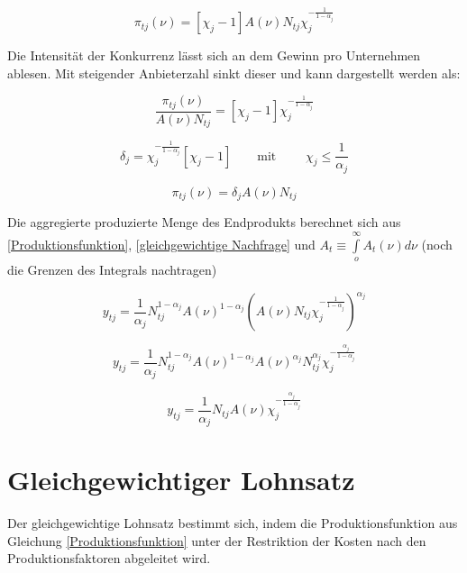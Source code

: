 \begin{equation}
\pi_{tj}(\nu)=[\chi_j-1]A(\nu)N_{tj}\chi_j^{-\frac{1}{1-\alpha_j}}
\end{equation}


Die Intensität der Konkurrenz lässt sich an dem Gewinn pro Unternehmen ablesen. Mit steigender Anbieterzahl sinkt dieser und kann dargestellt werden als:


\begin{equation}
\frac{\pi_{tj}(\nu)}{A(\nu)N_{tj}}=[\chi_j-1]\chi_j^{-\frac{1}{1-\alpha_j}}
\end{equation}


\begin{equation*}
\delta_j= \chi_j^{-\frac{1}{1-\alpha_j}}[\chi_j-1] \qquad  \text{mit } \qquad \chi_j\leq\frac{1}{\alpha_j}
\end{equation*}


\begin{equation}
\pi_{tj}(\nu)=\delta_jA(\nu)N_{tj}
\end{equation}


Die aggregierte produzierte Menge des Endprodukts berechnet sich aus \eqref{Produktionsfunktion}, \eqref{gleichgewichtige Nachfrage} und $A_t\equiv \int \limits_{o}^\infty{A_t(\nu)}d\nu$ (noch die Grenzen des Integrals nachtragen)


\begin{equation*}
y_{tj}=\frac{1}{\alpha_j}N_{tj}^{1-\alpha_j}A(\nu)^{1-\alpha_j}\left(A(\nu)N_{tj}\chi_j^{-\frac{1}{1-\alpha_j}}\right)^{\alpha_j}
\end{equation*}


\begin{equation*}
y_{tj}=\frac{1}{\alpha_j}N_{tj}^{1-\alpha_j}A(\nu)^{1-\alpha_j} A(\nu)^{\alpha_j}N_{tj}^{\alpha_j}\chi_j^{-\frac{\alpha_j}{1-\alpha_j}}
\end{equation*}


\begin{equation}
\boxed{y_{tj}=\frac{1}{\alpha_j}N_{tj}A(\nu)\chi_j^{-\frac{\alpha_j}{1-\alpha_j}}}
\end{equation}

\section{Gleichgewichtiger Lohnsatz}\label{sec:Appendix-Lohnsatz}


Der gleichgewichtige Lohnsatz bestimmt sich, indem die Produktionsfunktion aus Gleichung \eqref{Produktionsfunktion} unter der Restriktion der Kosten nach den Produktionsfaktoren abgeleitet wird.


